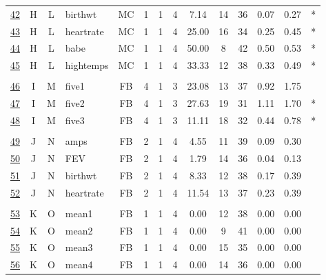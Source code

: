 \documentclass[12pt,english,nohyper]{tufte-handout}\usepackage[]{graphicx}\usepackage[]{color}
\begin{document}
\begin{longtable}{cccl|cccc|ccccc|l}
  \hyperlink{T03.H.L.04.1.1.MC.birthwt.2}{42} & H & L & birthwt & MC &   1 &   1 &   4 & 7.14 &  14 &  36 & 0.07 & 0.27 & * \\ 
  \hyperlink{T03.H.L.04.1.1.MC.heartrate.2}{43} & H & L & heartrate & MC &   1 &   1 &   4 & 25.00 &  16 &  34 & 0.25 & 0.45 & * \\ 
  \hyperlink{T03.H.L.04.1.1.MC.babe.2}{44} & H & L & babe & MC &   1 &   1 &   4 & 50.00 &   8 &  42 & 0.50 & 0.53 & * \\ 
  \hyperlink{T03.H.L.04.1.1.MC.hightemps.2}{45} & H & L & hightemps & MC &   1 &   1 &   4 & 33.33 &  12 &  38 & 0.33 & 0.49 & * \\ 
   &  &  &  &  &  &  &  &  &  &  &  &  &  \\ 
  \hyperlink{T03.I.M.03.1.4.FB.five1.2}{46} & I & M & five1 & FB &   4 &   1 &   3 & 23.08 &  13 &  37 & 0.92 & 1.75 &  \\ 
  \hyperlink{T03.I.M.03.1.4.FB.five2.2}{47} & I & M & five2 & FB &   4 &   1 &   3 & 27.63 &  19 &  31 & 1.11 & 1.70 & * \\ 
  \hyperlink{T03.I.M.03.1.4.FB.five3.2}{48} & I & M & five3 & FB &   4 &   1 &   3 & 11.11 &  18 &  32 & 0.44 & 0.78 & * \\ 
   &  &  &  &  &  &  &  &  &  &  &  &  &  \\ 
  \hyperlink{T03.J.N.04.1.2.FB.amps.2}{49} & J & N & amps & FB &   2 &   1 &   4 & 4.55 &  11 &  39 & 0.09 & 0.30 &  \\ 
  \hyperlink{T03.J.N.04.1.2.FB.FEV.2}{50} & J & N & FEV & FB &   2 &   1 &   4 & 1.79 &  14 &  36 & 0.04 & 0.13 &  \\ 
  \hyperlink{T03.J.N.04.1.2.FB.birthwt.2}{51} & J & N & birthwt & FB &   2 &   1 &   4 & 8.33 &  12 &  38 & 0.17 & 0.39 &  \\ 
  \hyperlink{T03.J.N.04.1.2.FB.heartrate.2}{52} & J & N & heartrate & FB &   2 &   1 &   4 & 11.54 &  13 &  37 & 0.23 & 0.39 &  \\ 
   &  &  &  &  &  &  &  &  &  &  &  &  &  \\ 
  \hyperlink{T03.K.O.04.1.1.FB.mean1.2}{53} & K & O & mean1 & FB &   1 &   1 &   4 & 0.00 &  12 &  38 & 0.00 & 0.00 &  \\ 
  \hyperlink{T03.K.O.04.1.1.FB.mean2.2}{54} & K & O & mean2 & FB &   1 &   1 &   4 & 0.00 &   9 &  41 & 0.00 & 0.00 &  \\ 
  \hyperlink{T03.K.O.04.1.1.FB.mean3.2}{55} & K & O & mean3 & FB &   1 &   1 &   4 & 0.00 &  15 &  35 & 0.00 & 0.00 &  \\ 
  \hyperlink{T03.K.O.04.1.1.FB.mean4.2}{56} & K & O & mean4 & FB &   1 &   1 &   4 & 0.00 &  14 &  36 & 0.00 & 0.00 &  \\ 

\end{longtable}
\end{document}
